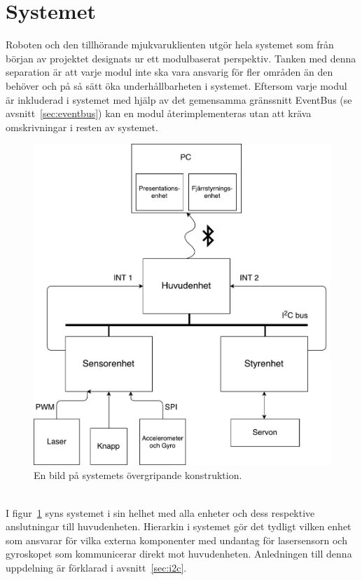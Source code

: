 \documentclass{article}
\begin{document}
\clearpage
\section{Systemet}
Roboten och den tillhörande mjukvaruklienten utgör hela systemet som från början av projektet designats ur ett modulbaserat perspektiv. Tanken med denna separation är att varje modul inte ska vara ansvarig för fler områden än den behöver och på så sätt öka underhållbarheten i systemet. Eftersom varje modul är inkluderad i systemet med hjälp av det gemensamma gränssnitt EventBus (se avsnitt~\ref{sec:eventbus}) kan en modul återimplementeras utan att kräva omskrivningar i resten av systemet.

\begin{figure}[H]
\centering
\includegraphics[scale=0.4]{oversikt_systemet}
\caption{En bild på systemets övergripande konstruktion.}
\label{fig:oversikt_systemet}
\end{figure}
\ \\
I figur~\ref{fig:oversikt_systemet} syns systemet i sin helhet med alla enheter och dess respektive anslutningar till huvudenheten. Hierarkin i systemet gör det tydligt vilken enhet som ansvarar för vilka externa komponenter med undantag för lasersensorn och gyroskopet som kommunicerar direkt mot huvudenheten. Anledningen till denna uppdelning är förklarad i avsnitt~\ref{sec:i2c}.
\end{document}

